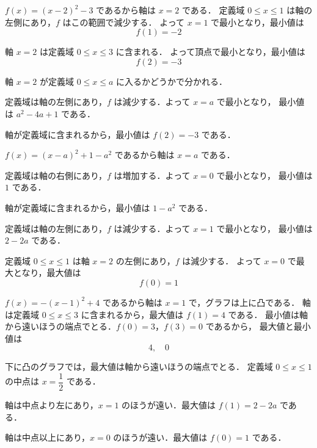 \documentclass[lualatex,paper=b5j,fontsize=10pt,twoside]{jlreq}
\begin{document}
\begin{mmproblems}
  \item $f(x)=(x-2)^2-3$ であるから軸は $x=2$ である．
    定義域 $0\leq x\leq 1$ は軸の左側にあり，$f$ はこの範囲で減少する．
    よって $x=1$ で最小となり，最小値は
    \[
      f(1)=-2
    \]

  \item 軸 $x=2$ は定義域 $0\leq x\leq 3$ に含まれる．
    よって頂点で最小となり，最小値は
    \[
      f(2)=-3
    \]

  \item 軸 $x=2$ が定義域 $0\leq x\leq a$ に入るかどうかで分かれる．

    定義域は軸の左側にあり，$f$ は減少する．よって $x=a$ で最小となり，
    最小値は $a^2-4a+1$ である．

    軸が定義域に含まれるから，最小値は $f(2)=-3$ である．

  \item $f(x)=(x-a)^2+1-a^2$ であるから軸は $x=a$ である．

    定義域は軸の右側にあり，$f$ は増加する．よって $x=0$ で最小となり，
    最小値は $1$ である．

    軸が定義域に含まれるから，最小値は $1-a^2$ である．

    定義域は軸の左側にあり，$f$ は減少する．よって $x=1$ で最小となり，
    最小値は $2-2a$ である．

  \item 定義域 $0\leq x\leq 1$ は軸 $x=2$ の左側にあり，$f$ は減少する．
    よって $x=0$ で最大となり，最大値は
    \[
      f(0)=1
    \]

  \item $f(x)=-(x-1)^2+4$ であるから軸は $x=1$ で，グラフは上に凸である．
    軸は定義域 $0\leq x\leq 3$ に含まれるから，最大値は $f(1)=4$ である．
    最小値は軸から遠いほうの端点でとる．$f(0)=3$，$f(3)=0$ であるから，
    最大値と最小値は
    \[
      4,\quad 0
    \]

  \item 下に凸のグラフでは，最大値は軸から遠いほうの端点でとる．
    定義域 $0\leq x\leq 1$ の中点は $x=\dfrac{1}{2}$ である．

    軸は中点より左にあり，$x=1$ のほうが遠い．最大値は $f(1)=2-2a$ である．

    軸は中点以上にあり，$x=0$ のほうが遠い．最大値は $f(0)=1$ である．


\end{mmproblems}
\end{document}
